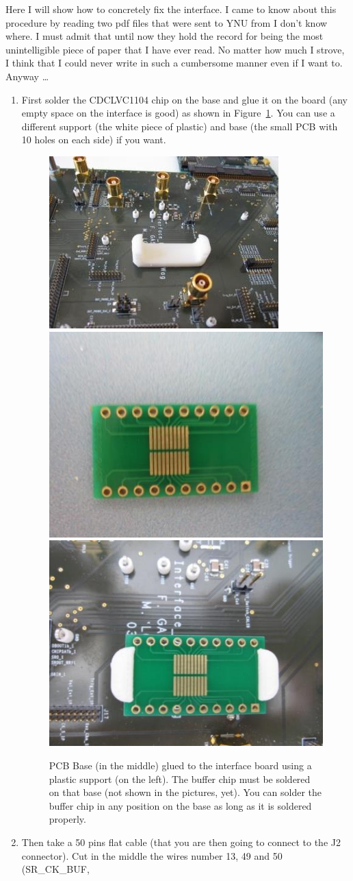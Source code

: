 Here I will show how to concretely fix the interface. I came to know about this
procedure by reading two pdf files that were sent to YNU from I don't know
where. I must admit that until now they hold the record for being the most
unintelligible piece of paper that I have ever read. No matter how much I
strove, I think that I could never write in such a cumbersome manner even if I
want to. Anyway \dots
\begin{enumerate}
\item First solder the CDCLVC1104 chip on the base and glue it on the board (any
  empty space on the interface is good) as shown in Figure~\ref{buffer}. You can
  use a different support (the white piece of plastic) and base
  (the small PCB with 10 holes on each side) if you want.
  \begin{figure}[H]
    \centering \includegraphics[frame,width=.3\textwidth]{support}\hfill
    \includegraphics[frame,width=.3\textwidth]{base}\hfill
    \includegraphics[frame,width=.3\textwidth]{base-glued}
    \caption{PCB Base (in the middle) glued to the interface board using a
      plastic support (on the left). The buffer chip must be soldered on that
      base (not shown in the pictures, yet). You can solder the buffer chip in
      any position on the base as long as it is soldered
      properly.}\label{buffer}
  \end{figure}
\item Then take a 50 pins flat cable (that you are then going to connect to the
  J2 connector). Cut in the middle the wires number 13, 49 and 50 (SR\_CK\_BUF,

\end{enumerate}
